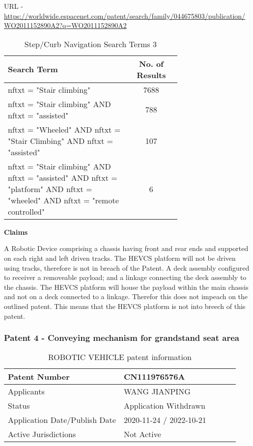 \documentclass [12pt]{article}
\begin{document}
URL - \url{https://worldwide.espacenet.com/patent/search/family/044675803/publication/WO2011152890A2?q=WO2011152890A2}

\begin{table}[H]
    \centering
    \setlength{\arrayrulewidth}{1.5pt}
    \begin{tabular}{|p{0.7\linewidth}|c|}
    \hline
    \cellcolor{gray!40}Search Term & \cellcolor{gray!40}No. of Results \\
    \hline
    nftxt = "Stair climbing" & 7688 \\
    \hline
    nftxt = "Stair climbing" AND nftxt = "assisted" & 788 \\
    \hline
    nftxt = "Wheeled" AND nftxt = "Stair Climbing" AND nftxt = "assisted" & 107 \\
    \hline
    nftxt = "Stair climbing" AND nftxt = "assisted" AND nftxt = "platform" AND nftxt = "wheeled" AND nftxt = "remote controlled"& 6 \\
    \hline
    \end{tabular}
    \caption{Step/Curb Navigation Search Terms 3}
    \label{table:step_curb_nav_st_3}
\end{table}

\textbf{Claims}

A Robotic Device comprising a chassis having front and rear ends and supported on each right and left driven tracks.
The HEVCS platform will not be driven using tracks, therefore is not in breach of the Patent.
A deck assembly configured to receiver a removeable payload; and a linkage connecting the deck assembly to the chassis.
The HEVCS platform will house the payload within the main chassis and not on a deck connected to a linkage. Therefor this does not impeach on the outlined patent.
This means that the HEVCS platform is not into breech of this patent.

\subsubsection{Patent 4 - Conveying mechanism for grandstand seat area}

\begin{table}[H]
    \centering
    \setlength{\arrayrulewidth}{1.5pt}
    \begin{tabular}{|p{0.5\linewidth}|p{0.5\linewidth}|}
    \hline
    Patent Number & CN111976576A\\
    \hline
    Applicants & WANG JIANPING\\
    \hline
    Status & Application Withdrawn\\
    \hline
    Application Date/Publish Date & 2020-11-24 / 2022-10-21\\
    \hline
    Active Jurisdictions & Not Active\\
    \hline
    \end{tabular}
    \caption{ROBOTIC VEHICLE patent information}
    \label{table:robotic_vehicle_patent_information}
\end{table}
\end{document}
